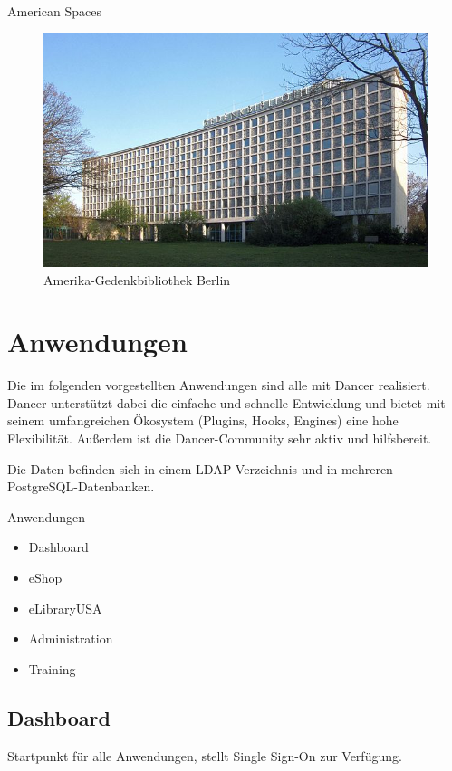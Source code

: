 \begin{frame}{American Spaces}
\begin{figure}
\includegraphics{Amerika-Gedenk-Bibliothek.jpg}
\caption{Amerika-Gedenkbibliothek Berlin}
\end{figure}
\end{frame}

\section{Anwendungen}
    
Die im folgenden vorgestellten Anwendungen sind alle mit Dancer realisiert.
Dancer unterstützt dabei die einfache und schnelle Entwicklung und bietet mit
seinem umfangreichen Ökosystem (Plugins, Hooks, Engines) eine hohe
Flexibilität. Außerdem ist die Dancer-Community sehr aktiv und
hilfsbereit.

Die Daten befinden sich in einem LDAP-Verzeichnis und in
mehreren PostgreSQL-Datenbanken.

\begin{frame}{Anwendungen}
\begin{itemize}
\item Dashboard
\item eShop
\item eLibraryUSA
\item Administration
\item Training
\end{itemize}
\end{frame}

\subsection{Dashboard}
Startpunkt für alle Anwendungen, stellt Single Sign-On zur Verfügung.

